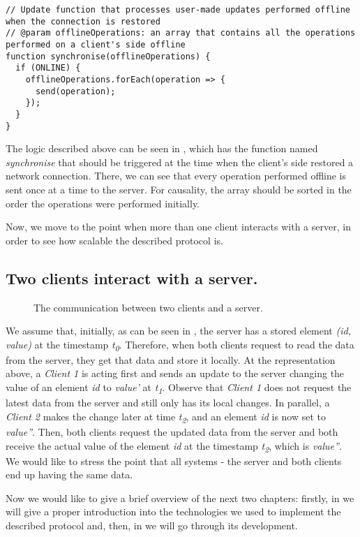 \begin{lstlisting}[caption={Pseudocode for sending offline performed operations to the server: client.}, label={lst:offline}]
// Update function that processes user-made updates performed offline when the connection is restored
// @param offlineOperations: an array that contains all the operations performed on a client's side offline
function synchronise(offlineOperations) {
  if (ONLINE) {
    offlineOperations.forEach(operation => {
      send(operation);
    });
  }
}
\end{lstlisting} 

The logic described above can be seen in , which has the function named \textit{synchronise} that should be triggered at the time when the client's side restored a network connection. There, we can see that every operation performed offline is sent once at a time to the server. For causality, the array should be sorted in the order the operations were performed initially.

Now, we move to the point when more than one client interacts with a server, in order to see how scalable the described protocol is.

\subsection*{Two clients interact with a server.}

\begin{figure}[!htb]
    \begin{center}
    \def\svgwidth{\linewidth}
    
    \caption {The communication between two clients and a server.}
    \label{fig:design5}
\end{center}
\end{figure}

We assume that, initially, as can be seen in , the server has a stored element \textit{(id, value)} at the timestamp \textit{t\textsubscript{0}}. Therefore, when both clients request to read the data from the server, they get that data and store it locally. At the representation above, a \textit{Client 1} is acting first and sends an update to the server changing the value of an element \textit{id} to \textit{value'} at \textit{t\textsubscript{1}}. Observe that \textit{Client 1} does not request the latest data from the server and still only has its local changes. In parallel, a \textit{Client 2} makes the change later at time \textit{t\textsubscript{2}}, and an element \textit{id} is now set to \textit{value''}. Then, both clients request the updated data from the server and both receive the actual value of the element \textit{id} at the timestamp \textit{t\textsubscript{2}}, which is \textit{value''}. We would like to stress the point that all systems - the server and both clients end up having the same data.

Now we would like to give a brief overview of the next two chapters: firstly, in  we will give a proper introduction into the technologies we used to implement the described protocol and, then, in  we will go through its development.